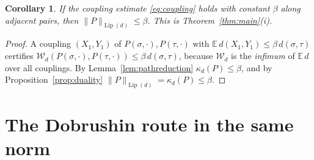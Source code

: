 \documentclass{amsart}
\newtheorem{corollary}{Corollary}
\DeclareMathOperator{\Lip}{Lip}
\newcommand{\E}{\mathbb{E}}
\newcommand{\Wd}{\mathcal{W}_d}
\begin{document}
\begin{corollary}\label{cor:i}
If the coupling estimate \eqref{eq:coupling} holds with constant $\beta$ along
adjacent pairs, then $\|P\|_{\Lip(d)}\le\beta$. This is
Theorem~\ref{thm:main}(i).
\end{corollary}
\begin{proof}
A coupling $(X_1,Y_1)$ of $P(\sigma,\cdot),P(\tau,\cdot)$ with
$\E\,d(X_1,Y_1)\le\beta\,d(\sigma,\tau)$ certifies
$\Wd(P(\sigma,\cdot),P(\tau,\cdot))\le\beta\,d(\sigma,\tau)$, because $\Wd$ is the
\emph{infimum} of $\E\,d$ over all couplings. By Lemma~\ref{lem:pathreduction}
$\kappa_d(P)\le\beta$, and by Proposition~\ref{prop:duality}
$\|P\|_{\Lip(d)}=\kappa_d(P)\le\beta$.
\end{proof}

\section{The Dobrushin route in the same norm}
\end{document}
